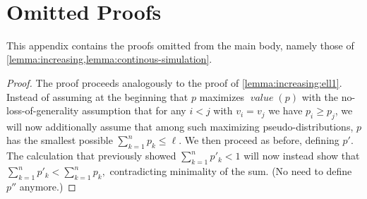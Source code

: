 \documentclass[sigconf,nonacm]{aamas}
\DeclareMathOperator{\valueText}{\textit{value}}
\newcommand{\val}[1]{\valueText({#1})}
\begin{document}
 



\newpage
\ 
\newpage 

\appendix

\section{Omitted Proofs}

This appendix contains the proofs omitted from the main body, namely those of \cref{lemma:increasing,lemma:continous-simulation}.

\lemmaincreasing*
\begin{proof} The proof proceeds analogously to the proof of \cref{lemma:increasing:ell1}. Instead of assuming at the beginning that $p$ maximizes $\val{p}$ with the no-loss-of-generality assumption that for any $i < j$ with $v_i = v_j$ we have $p_i \geq p_j$, we will now additionally assume that among such maximizing pseudo-distributions, $p$ has the smallest possible $\sum_{k = 1}^{n}p_k \leq \ell.$ We then proceed as before, defining $p'.$ The calculation that previously showed $\sum_{k = 1}^{n}p'_k < 1$ will now instead show that $\sum_{k = 1}^{n}p'_k < \sum_{k = 1}^{n}p_k,$ contradicting minimality of the sum. (No need to define $p''$ anymore.)
\end{proof}
\end{document}
